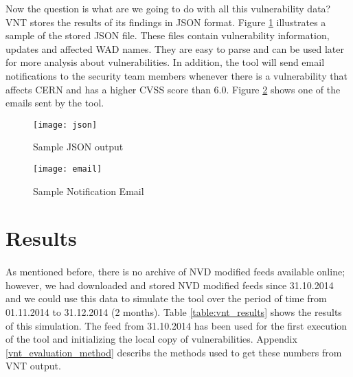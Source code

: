 Now the question is what are we going to do with all this vulnerability data? VNT stores the results of its findings in JSON format. Figure \ref{figure:json_output} illustrates a sample of the stored JSON file. These files contain vulnerability information, updates and affected WAD names. They are easy to parse and can be used later for more analysis about vulnerabilities.
In addition, the tool will send email notifications to the security team members whenever there is a vulnerability that affects CERN and has a higher CVSS score than 6.0. Figure \ref{figure:email_output} shows one of the emails sent by the tool.
\\
\begin{figure}[h!]
\label{figure:json_output}
  \centering
    \texttt{[image: json]}
  \caption{Sample JSON output}
\end{figure}

\begin{figure}[h!]
\label{figure:email_output}
  \centering
    \texttt{[image: email]}
  \caption{Sample Notification Email}
\end{figure}


\section{Results}

\paragraph{}
As mentioned before, there is no archive of NVD modified feeds available online; however, we had downloaded and stored NVD modified feeds since 31.10.2014 and we could use this data to simulate the tool over the period of time from 01.11.2014 to 31.12.2014 (2 months). Table \ref{table:vnt_results} shows the results of this simulation. The feed from 31.10.2014 has been used for the first execution of the tool and initializing the local copy of vulnerabilities. Appendix \ref{vnt_evaluation_method} describs the methods used to get these numbers from VNT output.

